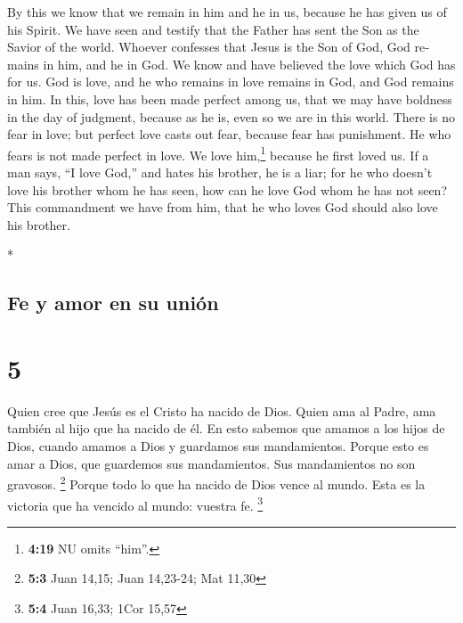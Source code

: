 \begin{paracol}{2}
\begin{otherlanguage}{english}
 By this we know that we remain in him and he in us,
because he has given us of his Spirit.  We have seen and
testify that the Father has sent the Son as the Savior of the world.
 Whoever confesses that Jesus is the Son of God, God
remains in him, and he in God.  We know and have believed
the love which God has for us. God is love, and he who remains in love
remains in God, and God remains in him.  In this, love
has been made perfect among us, that we may have boldness in the day of
judgment, because as he is, even so we are in this world.
 There is no fear in love; but perfect love casts out
fear, because fear has punishment. He who fears is not made perfect in
love.  We love him,\footnote{\textbf{4:19} NU omits
  ``him''.} because he first loved us.  If a man says,
``I love God,'' and hates his brother, he is a liar; for he who doesn't
love his brother whom he has seen, how can he love God whom he has not
seen?  This commandment we have from him, that he who
loves God should also love his brother.

\end{otherlanguage}

\switchcolumn[0]*

\hypertarget{fe-y-amor-en-su-uniuxf3n}{%
\subsection{Fe y amor en su unión}\label{fe-y-amor-en-su-uniuxf3n}}

\hypertarget{section-8}{%
\section{5}\label{section-8}}

 Quien cree que Jesús es el Cristo ha nacido de Dios.
Quien ama al Padre, ama también al hijo que ha nacido de él.
 En esto sabemos que amamos a los hijos de Dios, cuando
amamos a Dios y guardamos sus mandamientos.  Porque esto
es amar a Dios, que guardemos sus mandamientos. Sus mandamientos no son
gravosos. \footnote{\textbf{5:3} Juan 14,15; Juan 14,23-24; Mat 11,30}
 Porque todo lo que ha nacido de Dios vence al mundo. Esta
es la victoria que ha vencido al mundo: vuestra fe. \footnote{\textbf{5:4}
  Juan 16,33; 1Cor 15,57}

\hypertarget{el-agua-la-sangre-y-el-espuxedritu-santo-establecen-la-fe-en-jesuxfas-a-travuxe9s-de-su-testimonio}{%
}
\end{paracol}
